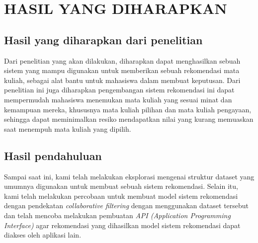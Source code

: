 \chapter{HASIL YANG DIHARAPKAN}

\section{Hasil yang diharapkan dari penelitian}
Dari penelitian yang akan dilakukan, diharapkan dapat menghasilkan sebuah sistem yang mampu digunakan untuk
memberikan sebuah rekomendasi mata kuliah, sebagai alat bantu untuk mahasiswa dalam membuat keputusan. Dari penelitian ini juga
diharapkan pengembangan sistem rekomendasi ini dapat mempermudah mahasiswa menemukan mata kuliah yang sesuai minat dan kemampuan mereka,
khususnya mata kuliah pilihan dan mata kuliah pengayaan, sehingga dapat meminimalkan resiko mendapatkan nilai yang kurang memuaskan saat
menempuh mata kuliah yang dipilih.

\section{Hasil pendahuluan}
Sampai saat ini, kami telah melakukan eksplorasi mengenai struktur dataset yang umumnya digunakan untuk membuat sebuah sistem rekomendasi.
Selain itu, kami telah melakukan percobaan untuk membuat model sistem rekomendasi dengan pendekatan \emph{collaborative filtering}
dengan menggunakan dataset tersebut dan telah mencoba melakukan pembuatan \emph{API (Application Programming Interface)} agar rekomendasi yang
dihasilkan model sistem rekomendasi dapat diakses oleh aplikasi lain.

\newpage

